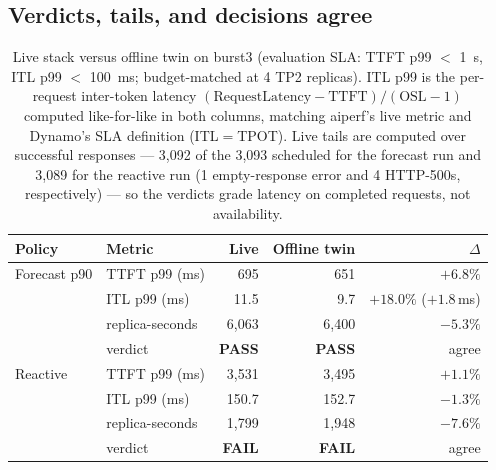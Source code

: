 \subsection{Verdicts, tails, and decisions agree}

\begin{table}[htbp]
\centering
\caption[Live stack versus offline twin on burst3]{Live stack versus offline
twin on burst3 (evaluation SLA: TTFT p99 $<$ \SI{1}{\second}, ITL p99 $<$
\SI{100}{\milli\second}; budget-matched at 4 TP2 replicas). ITL p99 is the
per-request inter-token latency
$(\text{RequestLatency}-\text{TTFT})/(\text{OSL}-1)$ computed like-for-like
in both columns, matching aiperf's live metric and Dynamo's SLA definition
(ITL${=}$TPOT). Live tails are computed over successful responses ---
3{,}092 of the 3{,}093 scheduled for the forecast run and 3{,}089 for the
reactive run (1 empty-response error and 4 HTTP-500s, respectively) --- so
the verdicts grade latency on completed requests, not availability.}
\label{tab:val-anchor}
\small
\begin{tabular}{@{}llrrr@{}}
\toprule
Policy & Metric & Live & Offline twin & $\Delta$ \\
\midrule
Forecast p90 & TTFT p99 (ms) & 695 & 651 & $+6.8\%$ \\
 & ITL p99 (ms) & 11.5 & 9.7 & $+18.0\%$ ($+1.8$\,ms) \\
 & replica-seconds & 6{,}063 & 6{,}400 & $-5.3\%$ \\
 & verdict & \textbf{PASS} & \textbf{PASS} & agree \\
\midrule
Reactive & TTFT p99 (ms) & 3{,}531 & 3{,}495 & $+1.1\%$ \\
 & ITL p99 (ms) & 150.7 & 152.7 & $-1.3\%$ \\
 & replica-seconds & 1{,}799 & 1{,}948 & $-7.6\%$ \\
 & verdict & \textbf{FAIL} & \textbf{FAIL} & agree \\
\bottomrule
\end{tabular}
\end{table}

